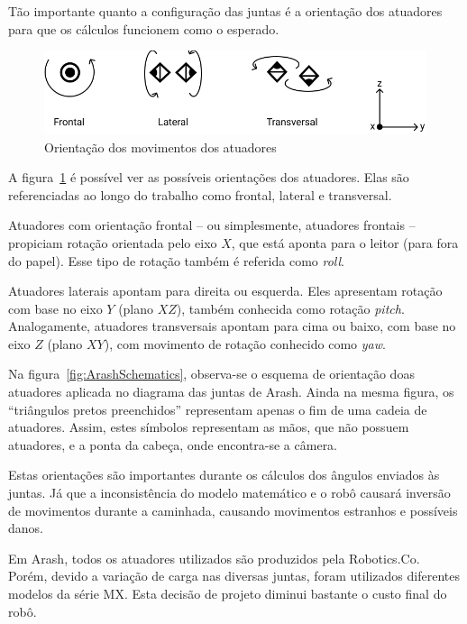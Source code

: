 Tão importante quanto a configuração das juntas é a orientação dos atuadores para que os cálculos funcionem como o esperado.

\begin{figure}[htb]
	\centering
	\includegraphics[scale=1]{imagens/svg/actuators-orientation}
	\caption{Orientação dos movimentos dos atuadores}
	\label{fig:ActuatorsOrientation}
\end{figure}

A figura~\ref{fig:ActuatorsOrientation} é possível ver as possíveis orientações dos atuadores. Elas são referenciadas ao longo do trabalho como frontal, lateral e transversal.

Atuadores com orientação frontal -- ou simplesmente, atuadores frontais -- propiciam rotação orientada pelo eixo $X$, que está aponta para o leitor (para fora do papel). Esse tipo de rotação também é referida como \textit{roll}.

Atuadores laterais apontam para direita ou esquerda. Eles apresentam rotação com base no eixo $Y$ (plano $XZ$), também conhecida como rotação \textit{pitch}. Analogamente, atuadores transversais apontam para cima ou baixo, com base no eixo $Z$ (plano $XY$), com movimento de rotação conhecido como \textit{yaw}.

Na figura~\ref{fig:ArashSchematics}, observa-se o esquema de orientação doas atuadores aplicada no diagrama das juntas de Arash. Ainda na mesma figura, os ``triângulos pretos preenchidos'' representam apenas o fim de uma cadeia de atuadores. Assim, estes símbolos representam as mãos, que não possuem atuadores, e a ponta da cabeça, onde encontra-se a câmera. 

Estas orientações são importantes durante os cálculos dos ângulos enviados às juntas. Já que a inconsistência do modelo matemático e o robô causará inversão de movimentos durante a caminhada, causando movimentos estranhos e possíveis danos.

Em Arash, todos os atuadores utilizados são produzidos pela Robotics.Co. Porém, devido a variação de carga nas diversas juntas, foram utilizados diferentes  modelos da série MX. Esta decisão de projeto diminui bastante o custo final do robô.

